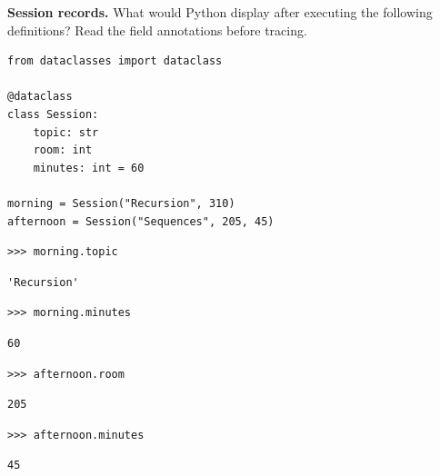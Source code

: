 \begin{blocksection}
\question \textbf{Session records.} What would Python display after executing
the following definitions? Read the field annotations before tracing.

\begin{lstlisting}
from dataclasses import dataclass

@dataclass
class Session:
    topic: str
    room: int
    minutes: int = 60

morning = Session("Recursion", 310)
afternoon = Session("Sequences", 205, 45)
\end{lstlisting}
\end{blocksection}

\begin{blocksection}
\begin{lstlisting}
>>> morning.topic
\end{lstlisting}
\begin{solution}[.35in]
\begin{lstlisting}
'Recursion'
\end{lstlisting}
\end{solution}
\end{blocksection}

\begin{blocksection}
\begin{lstlisting}
>>> morning.minutes
\end{lstlisting}
\begin{solution}[.35in]
\begin{lstlisting}
60
\end{lstlisting}
\end{solution}
\end{blocksection}

\begin{blocksection}
\begin{lstlisting}
>>> afternoon.room
\end{lstlisting}
\begin{solution}[.35in]
\begin{lstlisting}
205
\end{lstlisting}
\end{solution}
\end{blocksection}

\begin{blocksection}
\begin{lstlisting}
>>> afternoon.minutes
\end{lstlisting}
\begin{solution}[.35in]
\begin{lstlisting}
45
\end{lstlisting}
\end{solution}
\end{blocksection}

